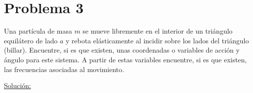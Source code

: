 \documentclass[a4paper,10pt]{article}
\numberwithin{equation}{section}
\begin{document}
\section{Problema 3}

Una partícula de masa $m$ se mueve libremente en el interior de un triángulo  
equilátero de lado $a$ y rebota elásticamente al incidir sobre los lados del triángulo 
(billar). Encuentre, si es que existen, unas coordenadas o variables de acción 
y ángulo para este sistema. A partir de estas variables encuentre, si es que existen,
las frecuencias asociadas al movimiento. 

\vspace{.3cm}

\underline{Solución:} \vspace{.3cm}
\end{document}
